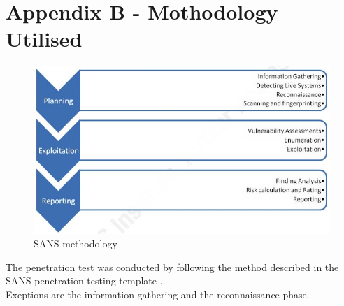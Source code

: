 \section{Appendix B - Mothodology Utilised}

\begin{figure}[h!]
\centering
\includegraphics[scale=0.8]{./Graphics/sansmeth.JPG}
\caption{SANS methodology \cite{sans}}
\end{figure}

The penetration test was conducted by following the method described in the SANS penetration testing template \cite{sans}. \\
Exeptions are the information gathering and the reconnaissance phase.